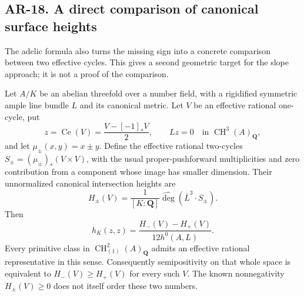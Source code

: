 \subsection*{AR-18. A direct comparison of canonical surface heights}

The adelic formula also turns the missing sign into a concrete comparison
between two effective cycles. This gives a second geometric target for
the slope approach; it is not a proof of the comparison.

\begin{proposition}[AR-18]
Let $A/K$ be an abelian threefold over a number field, with a rigidified
symmetric ample line bundle $L$ and its canonical metric. Let $V$ be an
effective rational one-cycle, put
\[
 z=\operatorname{Ce}(V)=\frac{V-[-1]_*V}{2},
 \qquad Lz=0\quad\text{in }\operatorname{CH}^3(A)_{\mathbf Q},
\]
and let $\mu_\pm(x,y)=x\pm y$. Define the effective rational two-cycles
$S_\pm=(\mu_\pm)_*(V\times V)$, with the usual proper-pushforward
multiplicities and zero contribution from a component whose image has
smaller dimension. Their unnormalized canonical intersection heights are
\[
 H_\pm(V)=\frac1{[K:\mathbf Q]}
       \widehat{\deg}(\overline L^3\cdot S_\pm).
\]
Then
\[
 h_K(z,z)=\frac{H_-(V)-H_+(V)}{12h^0(A,L)}.                 \tag{AR.34}
\]
Every primitive class in $\operatorname{CH}^2_{(1)}(A)_{\mathbf Q}$
admits an effective rational representative in this sense. Consequently
semipositivity on that whole space is equivalent to
$H_-(V)\ge H_+(V)$ for every such $V$. The known nonnegativity
$H_\pm(V)\ge0$ does not itself order these two numbers.
\end{proposition}

